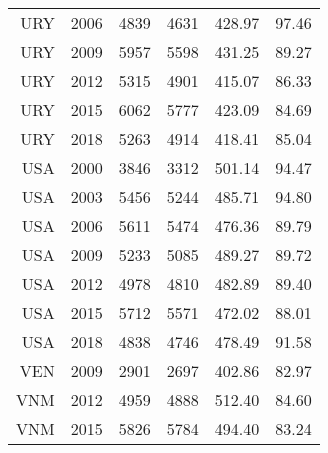 \begin{longtable}{|r|r|r|r|r|r|}
    URY   & 2006  & 4839  & 4631  & 428.97 & 97.46 \\
    URY   & 2009  & 5957  & 5598  & 431.25 & 89.27 \\
    URY   & 2012  & 5315  & 4901  & 415.07 & 86.33 \\
    URY   & 2015  & 6062  & 5777  & 423.09 & 84.69 \\
    URY   & 2018  & 5263  & 4914  & 418.41 & 85.04 \\
    USA   & 2000  & 3846  & 3312  & 501.14 & 94.47 \\
    USA   & 2003  & 5456  & 5244  & 485.71 & 94.80 \\
    USA   & 2006  & 5611  & 5474  & 476.36 & 89.79 \\
    USA   & 2009  & 5233  & 5085  & 489.27 & 89.72 \\
    USA   & 2012  & 4978  & 4810  & 482.89 & 89.40 \\
    USA   & 2015  & 5712  & 5571  & 472.02 & 88.01 \\
    USA   & 2018  & 4838  & 4746  & 478.49 & 91.58 \\
    VEN   & 2009  & 2901  & 2697  & 402.86 & 82.97 \\
    VNM   & 2012  & 4959  & 4888  & 512.40 & 84.60 \\
    VNM   & 2015  & 5826  & 5784  & 494.40 & 83.24 \\

\end{longtable}%